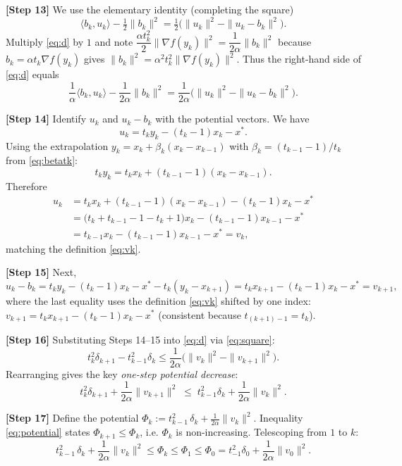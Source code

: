 \documentclass{article}
\begin{document}
\textbf{[Step 13]} We use the elementary identity (completing the square)
\begin{equation}
\langle b_k, u_k\rangle - \tfrac12\|b_k\|^2
= \tfrac12\Big(\|u_k\|^2 - \|u_k - b_k\|^2\Big). \label{eq:square}
\end{equation}
Multiply \eqref{eq:d} by $1$ and note
$\dfrac{\alpha t_k^2}{2}\|\nabla f(y_k)\|^2 = \dfrac{1}{2\alpha}\|b_k\|^2$
because $b_k = \alpha t_k\nabla f(y_k)$ gives
$\|b_k\|^2 = \alpha^2 t_k^2\|\nabla f(y_k)\|^2$. Thus the right-hand side of
\eqref{eq:d} equals
\[
\frac{1}{\alpha}\langle b_k, u_k\rangle - \frac{1}{2\alpha}\|b_k\|^2
= \frac{1}{2\alpha}\Big(\|u_k\|^2 - \|u_k - b_k\|^2\Big).
\]

\textbf{[Step 14]} Identify $u_k$ and $u_k - b_k$ with the potential vectors.
We have
\[
u_k = t_k y_k - (t_k-1)x_k - x^*.
\]
Using the extrapolation $y_k = x_k + \beta_k(x_k - x_{k-1})$ with
$\beta_k = (t_{k-1}-1)/t_k$ from \eqref{eq:betatk}:
\[
t_k y_k = t_k x_k + (t_{k-1}-1)(x_k - x_{k-1}).
\]
Therefore
\begin{align*}
u_k &= t_k x_k + (t_{k-1}-1)(x_k - x_{k-1}) - (t_k - 1)x_k - x^*\\
    &= \big(t_k + t_{k-1} - 1 - t_k + 1\big)x_k - (t_{k-1}-1)x_{k-1} - x^*\\
    &= t_{k-1}x_k - (t_{k-1}-1)x_{k-1} - x^* = v_k,
\end{align*}
matching the definition \eqref{eq:vk}. 

\textbf{[Step 15]} Next,
\[
u_k - b_k = t_k y_k - (t_k-1)x_k - x^* - t_k(y_k - x_{k+1})
= t_k x_{k+1} - (t_k-1)x_k - x^* = v_{k+1},
\]
where the last equality uses the definition \eqref{eq:vk} shifted by one index:
$v_{k+1} = t_k x_{k+1} - (t_k - 1)x_k - x^*$ (consistent because
$t_{(k+1)-1} = t_k$).

\textbf{[Step 16]} Substituting Steps 14--15 into \eqref{eq:d} via \eqref{eq:square}:
\[
t_k^2 \delta_{k+1} - t_{k-1}^2 \delta_k
\le \frac{1}{2\alpha}\Big(\|v_k\|^2 - \|v_{k+1}\|^2\Big).
\]
Rearranging gives the key \emph{one-step potential decrease}:
\begin{equation}
t_k^2 \delta_{k+1} + \frac{1}{2\alpha}\|v_{k+1}\|^2
\;\le\; t_{k-1}^2 \delta_k + \frac{1}{2\alpha}\|v_k\|^2. \label{eq:potential}
\end{equation}

\textbf{[Step 17]} Define the potential
$\Phi_k := t_{k-1}^2\,\delta_k + \frac{1}{2\alpha}\|v_k\|^2$.
Inequality \eqref{eq:potential} states $\Phi_{k+1} \le \Phi_k$, i.e.
$\Phi_k$ is non-increasing. Telescoping from $1$ to $k$:
\begin{equation}
t_{k-1}^2 \,\delta_k + \frac{1}{2\alpha}\|v_k\|^2
\le \Phi_k \le \Phi_1 \le \Phi_0
= t_{-1}^2\delta_0 + \frac{1}{2\alpha}\|v_0\|^2. \label{eq:tele}
\end{equation}
\end{document}
